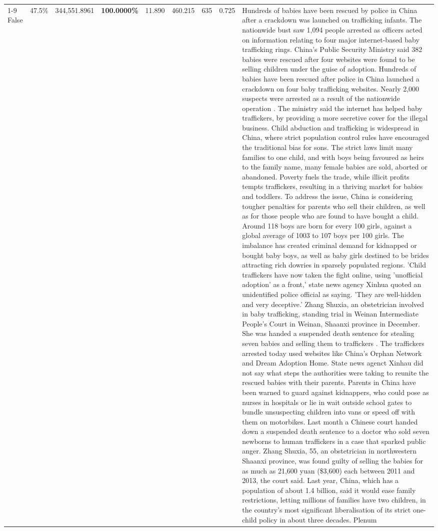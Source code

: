 \begin{table}[H]
\begin{tabular}{lllrlllll}
\cline{1-9}
False & 47.5\% & 344,551.8961 & \bfseries \color{red} 100.0000\% & 11.890 & 460.215 & 635 & 0.725 & Hundreds of babies have been rescued by police in China after a crackdown was launched on trafficking infants. The nationwide bust saw 1,094 people arrested as officers acted on information relating to four major internet-based baby trafficking rings. China's Public Security Ministry said 382 babies were rescued after four websites were found to be selling children under the guise of adoption. Hundreds of babies have been rescued after police in China launched a crackdown on four baby trafficking websites. Nearly 2,000 suspects were arrested as a result of the nationwide operation . The ministry said the internet has helped baby traffickers, by providing a more secretive cover for the illegal business. Child abduction and trafficking is widespread in China, where strict population control rules have encouraged the traditional bias for sons. The strict laws limit many families to one child, and with boys being favoured as heirs to the family name, many female babies are sold, aborted or abandoned. Poverty fuels the trade, while illicit profits tempts traffickers, resulting in a thriving market for babies and toddlers. To address the issue, China is considering tougher penalties for parents who sell their children, as well as for those people who are found to have bought a child. Around 118 boys are born for every 100 girls, against a global average of 1003 to 107 boys per 100 girls. The imbalance has created criminal demand for kidnapped or bought baby boys, as well as baby girls destined to be brides attracting rich dowries in sparsely populated regions. 'Child traffickers have now taken the fight online, using 'unofficial adoption' as a front,' state news agency Xinhua quoted an unidentified police official as saying. 'They are well-hidden and very deceptive.' Zhang Shuxia, an obstetrician involved in baby trafficking, standing trial in Weinan Intermediate People's Court in Weinan, Shaanxi province in December. She was handed a suspended death sentence for stealing seven babies and selling them to traffickers . The traffickers arrested today used websites like China's Orphan Network and Dream Adoption Home. State news agenct Xinhau did not say what steps the authorities were taking to reunite the rescued babies with their parents. Parents in China have been warned to guard against kidnappers, who could pose as nurses in hospitals or lie in wait outside school gates to bundle unsuspecting children into vans or speed off with them on motorbikes. Last month a Chinese court handed down a suspended death sentence to a doctor who sold seven newborns to human traffickers in a case that sparked public anger. Zhang Shuxia, 55, an obstetrician in northwestern Shaanxi province, was found guilty of selling the babies for as much as 21,600 yuan (\$3,600) each between 2011 and 2013, the court said. Last year, China, which has a population of about 1.4 billion, said it would ease family restrictions, letting millions of families have two children, in the country's most significant liberalisation of its strict one-child policy in about three decades. Plenum \\

\end{tabular}
\end{table}
